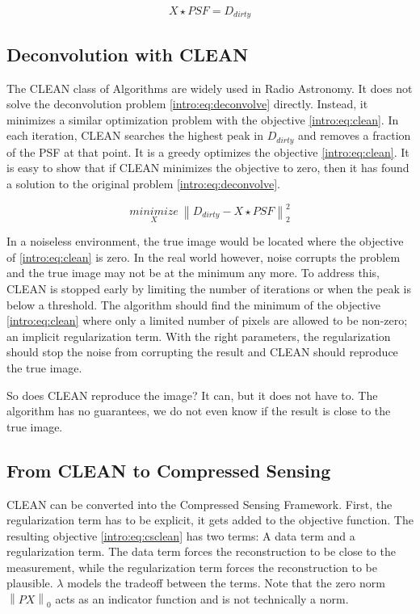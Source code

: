 \begin{equation}\label{intro:eq:deconvolve}
X \star  PSF = D_{dirty} 
\end{equation}


\subsection{Deconvolution with CLEAN}
The CLEAN class of Algorithms\cite{hogbom1974aperture}\cite{schwab1984relaxing}\cite{rich2008multi}\cite{rau2011multi} are widely used in Radio Astronomy. It does not solve the deconvolution problem \eqref{intro:eq:deconvolve} directly. Instead, it minimizes a similar optimization problem with the objective  \eqref{intro:eq:clean}. In each iteration, CLEAN searches the highest peak in $D_{dirty}$ and removes a fraction of the PSF at that point. It is a greedy optimizes the objective \eqref{intro:eq:clean}. It is easy to show that if CLEAN minimizes the objective to zero, then it has found a solution to the original problem \eqref{intro:eq:deconvolve}. 

\begin{equation}\label{intro:eq:clean}
\underset{X}{minimize} \: \left \| D_{dirty} - X \star PSF \right \|_2^2
\end{equation}

In a noiseless environment, the true image would be located where the objective of \eqref{intro:eq:clean} is zero. In the real world however, noise corrupts the problem and the true image may not be at the minimum any more. To address this, CLEAN is stopped early by limiting the number of iterations or when the peak is below a threshold. The algorithm should find the minimum of the objective \eqref{intro:eq:clean} where only a limited number of pixels are allowed to be non-zero; an implicit regularization term. With the right parameters, the regularization should stop the noise from corrupting the result and CLEAN should reproduce the true image.

So does CLEAN reproduce the image? It can, but it does not have to. The algorithm has no guarantees, we do not even know if the result is close to the true image. 


\subsection{From CLEAN to Compressed Sensing}
CLEAN can be converted into the Compressed Sensing Framework. First, the regularization term has to be explicit, it gets added to the objective function. The resulting objective \eqref{intro:eq:csclean} has two terms: A data term and a regularization term. The data term forces the reconstruction to be close to the measurement, while the regularization term forces the reconstruction to be plausible. $\lambda$ models the tradeoff between the terms. Note that the zero norm $\left \| PX \right \|_0$ acts as an indicator function and is not technically a norm.

